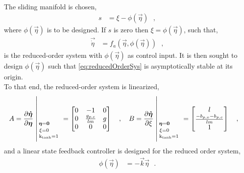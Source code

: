 %
%
%
%
%
%
%
%
%
%
The sliding manifold is chosen,
\begin{align}
s &=   \xi - \phi(\vec{\eta})    \ \ \ ,
\end{align}
where $\phi(\vec{\eta})$ is to be designed. If $s$ is zero then $\xi = \phi(\vec{\eta})$, such that,
\begin{align}
\vec{\dot{\eta}} &=  f_a(\vec{\eta},\phi(\vec{\eta}))     \ \ \ ,
\label{eq:reducedOrderSys}
\end{align}
is the reduced-order system with $\phi(\vec{\eta})$ as control input. It is then sought to design $\phi(\vec{\eta})$ such that \autoref{eq:reducedOrderSys} is asymptotically stable at its origin.\\
To that end, the reduced-order system is linearized,
%
\begin{align}
A &= \frac{\partial \vec{\dot{\eta}}}{\partial \vec{\eta}} \whereThree{\vec{\eta}=\vec{0}\ \ \ \ }{\xi=0\ \ \ \ }{\text{k}_\text{tanh}=1} \ 
=
\begin{bmatrix}
0 & -1                  & 0 \\
0 & \frac{g_{p,c}}{l m} & g \\
0 & 0                   & 0 
\end{bmatrix}   \ \ \ , \ \ \
B = \frac{\partial \vec{\dot{\eta}}}{\partial \xi} \whereThree{\vec{\eta}=\vec{0}\ \ \ \ }{\xi=0\ \ \ \ }{\text{k}_\text{tanh}=1} \ 
=
\begin{bmatrix}
l  \\
\frac{-b_{p,v}-b_{p,c}}{l m}  \\
1  
\end{bmatrix}   \ \ \ ,
\label{eq:linearReducedOrder_A}
\end{align}
%
and a linear state feedback controller is designed for the reduced order system,
\begin{align}
\phi(\vec{\eta}) &=   - \vec{k} \vec{\eta}  \ \ \ .
\end{align}
%
%
\\

